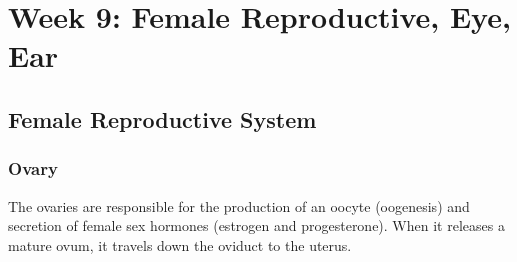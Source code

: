 \chapter{Week 9: Female Reproductive, Eye, Ear}

\section{Female Reproductive System}

\subsection{Ovary}
The ovaries are responsible for the production of an oocyte (oogenesis) and secretion of female sex hormones (estrogen and progesterone). When it releases a mature ovum, it travels down the oviduct to the uterus.
\begin{center}
\end{center}
